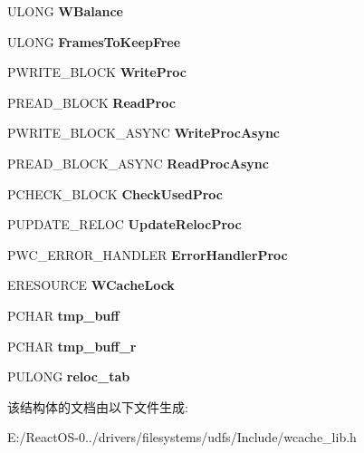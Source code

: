 \begin{DoxyCompactItemize}
U\+L\+O\+NG {\bfseries W\+Balance}
\item 
\mbox{\label{struct___w___c_a_c_h_e_a53f80ea25574b741f8f5b78b66b71f04}} 
U\+L\+O\+NG {\bfseries Frames\+To\+Keep\+Free}
\item 
\mbox{\label{struct___w___c_a_c_h_e_a959f9a5f203bf3702faf78da6b05e14c}} 
P\+W\+R\+I\+T\+E\+\_\+\+B\+L\+O\+CK {\bfseries Write\+Proc}
\item 
\mbox{\label{struct___w___c_a_c_h_e_ab45984ab54178ad9846a011fc8b0969c}} 
P\+R\+E\+A\+D\+\_\+\+B\+L\+O\+CK {\bfseries Read\+Proc}
\item 
\mbox{\label{struct___w___c_a_c_h_e_aed98532d25588f47eb329523ff135bcc}} 
P\+W\+R\+I\+T\+E\+\_\+\+B\+L\+O\+C\+K\+\_\+\+A\+S\+Y\+NC {\bfseries Write\+Proc\+Async}
\item 
\mbox{\label{struct___w___c_a_c_h_e_a2e9b1d5eb9d64e165cd555e94cee960d}} 
P\+R\+E\+A\+D\+\_\+\+B\+L\+O\+C\+K\+\_\+\+A\+S\+Y\+NC {\bfseries Read\+Proc\+Async}
\item 
\mbox{\label{struct___w___c_a_c_h_e_a287b036ae358582db7fa91f1a7fcb8b9}} 
P\+C\+H\+E\+C\+K\+\_\+\+B\+L\+O\+CK {\bfseries Check\+Used\+Proc}
\item 
\mbox{\label{struct___w___c_a_c_h_e_a547babc47cd3e2b95670133a31782756}} 
P\+U\+P\+D\+A\+T\+E\+\_\+\+R\+E\+L\+OC {\bfseries Update\+Reloc\+Proc}
\item 
\mbox{\label{struct___w___c_a_c_h_e_a8092621c461098517716a9f5d4f8263d}} 
P\+W\+C\+\_\+\+E\+R\+R\+O\+R\+\_\+\+H\+A\+N\+D\+L\+ER {\bfseries Error\+Handler\+Proc}
\item 
\mbox{\label{struct___w___c_a_c_h_e_a79d35e13faf9b44333357eb2c03c3d0f}} 
E\+R\+E\+S\+O\+U\+R\+CE {\bfseries W\+Cache\+Lock}
\item 
\mbox{\label{struct___w___c_a_c_h_e_a6f7696adf750afe6c5c4232cb30ac17d}} 
P\+C\+H\+AR {\bfseries tmp\+\_\+buff}
\item 
\mbox{\label{struct___w___c_a_c_h_e_abb8c761ab5da415508d19d0fad429c19}} 
P\+C\+H\+AR {\bfseries tmp\+\_\+buff\+\_\+r}
\item 
\mbox{\label{struct___w___c_a_c_h_e_a1d3d8d223529bdd196b51fb9ee61f42e}} 
P\+U\+L\+O\+NG {\bfseries reloc\+\_\+tab}
\end{DoxyCompactItemize}


该结构体的文档由以下文件生成\+:\begin{DoxyCompactItemize}
\item 
E\+:/\+React\+O\+S-\/0../drivers/filesystems/udfs/\+Include/wcache\+\_\+lib.\+h\end{DoxyCompactItemize}
